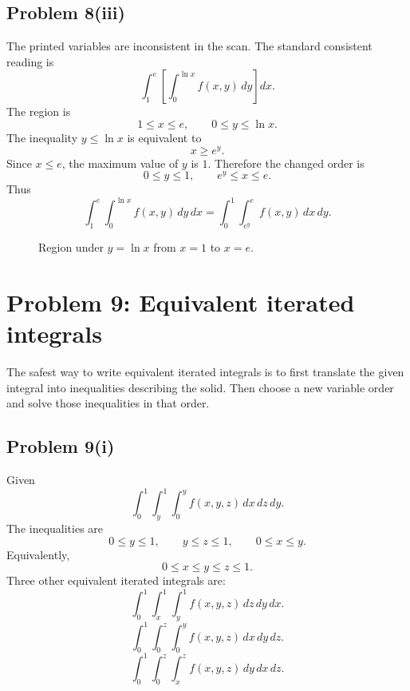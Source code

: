 \documentclass[11pt,a4paper]{article}
\begin{document}
\subsection{Problem 8(iii)}
The printed variables are inconsistent in the scan.  The standard consistent reading is
\[
 \int_1^e\left[\int_0^{\ln x}f(x,y)\,dy\right]dx.
\]
The region is
\[
 1\le x\le e,
\qquad 0\le y\le\ln x.
\]
The inequality \(y\le\ln x\) is equivalent to
\[
 x\ge e^y.
\]
Since \(x\le e\), the maximum value of \(y\) is \(1\).  Therefore the changed order is
\[
 0\le y\le1,
\qquad e^y\le x\le e.
\]
Thus
\[
\boxed{\int_1^e\int_0^{\ln x}f(x,y)\,dy\,dx
=\int_0^1\int_{e^y}^{e}f(x,y)\,dx\,dy.}
\]

\begin{figure}[H]
\centering
{}
\caption{Region under \(y=\ln x\) from \(x=1\) to \(x=e\).}
\end{figure}

\section{Problem 9: Equivalent iterated integrals}

\begin{methodbox}
The safest way to write equivalent iterated integrals is to first translate the given integral into inequalities describing the solid.  Then choose a new variable order and solve those inequalities in that order.
\end{methodbox}

\subsection{Problem 9(i)}
Given
\[
 \int_0^1\int_y^1\int_0^y f(x,y,z)\,dx\,dz\,dy.
\]
The inequalities are
\[
 0\le y\le1,
\qquad y\le z\le1,
\qquad 0\le x\le y.
\]
Equivalently,
\[
 0\le x\le y\le z\le1.
\]
Three other equivalent iterated integrals are:
\[
\boxed{\int_0^1\int_x^1\int_y^1 f(x,y,z)\,dz\,dy\,dx.}
\]
\[
\boxed{\int_0^1\int_0^z\int_0^y f(x,y,z)\,dx\,dy\,dz.}
\]
\[
\boxed{\int_0^1\int_0^z\int_x^z f(x,y,z)\,dy\,dx\,dz.}
\]
\end{document}
